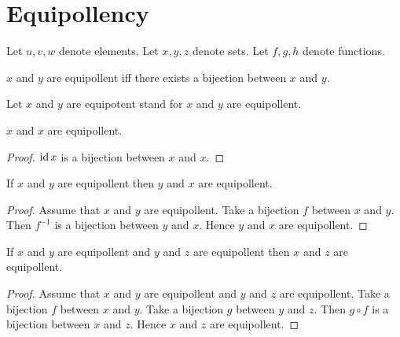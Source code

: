 \documentclass[../../basic-notions.ftl.tex]{subfiles}
\begin{document}
  \section{Equipollency}

  \begin{forthel}
  \end{forthel}

  \begin{forthel}
  Let $u,v,w$ denote elements.
  Let $x,y,z$ denote sets.
  Let $f,g,h$ denote functions.
  \end{forthel}


  \begin{forthel}
    \begin{definition}
      $x$ and $y$ are equipollent iff there exists a bijection between $x$ and $y$.
    \end{definition}

    Let $x$ and $y$ are equipotent stand for $x$ and $y$ are equipollent.

    \begin{proposition}[SF 01 07 639059]
      $x$ and $x$ are equipollent.
    \end{proposition}
    \begin{proof}
      $\operatorname{id}{x}$ is a bijection between $x$ and $x$.
    \end{proof}

    \begin{proposition}[SF 01 07 467393]
      If $x$ and $y$ are equipollent then $y$ and $x$ are equipollent.
    \end{proposition}
    \begin{proof}
      Assume that $x$ and $y$ are equipollent.
      Take a bijection $f$ between $x$ and $y$.
      Then $f^{-1}$ is a bijection between $y$ and $x$.
      Hence $y$ and $x$ are equipollent.
    \end{proof}

    \begin{proposition}[SF 01 07 956273]
      If $x$ and $y$ are equipollent and $y$ and $z$ are equipollent then $x$ and $z$ are equipollent.
    \end{proposition}
    \begin{proof}
      Assume that $x$ and $y$ are equipollent and $y$ and $z$ are equipollent.
      Take a bijection $f$ between $x$ and $y$.
      Take a bijection $g$ between $y$ and $z$.
      Then $g \circ f$ is a bijection between $x$ and $z$.
      Hence $x$ and $z$ are equipollent.
    \end{proof}


\end{forthel}
\end{document}
